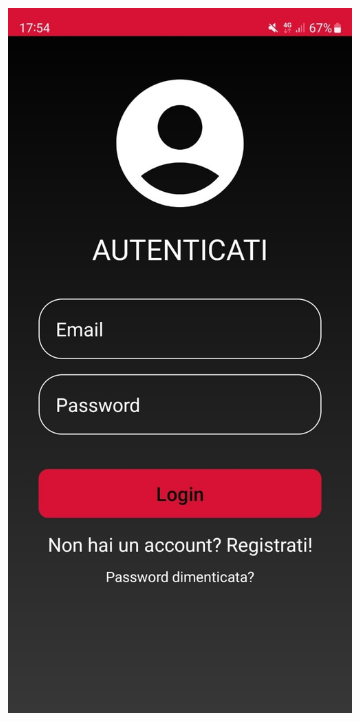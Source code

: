 \begin{figure}[ht]
\begin{subfigure}[b]{0.3\textwidth}
    \includegraphics[width=\textwidth, height=0.4\textheight]{Immagini/App/login_scuro.jpeg}
  \end{subfigure}
  \begin{subfigure}[b]{0.3\textwidth}

\end{subfigure}
\end{figure}
